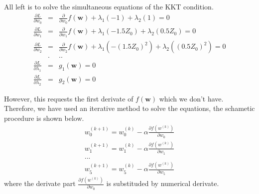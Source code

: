 All left is to solve the simultaneous equations of the KKT condition.
\begin{eqnarray}
  \frac{\partial L}{\partial w_0}&=&\frac{\partial}{\partial w_0}f(\mathbf{w})+\lambda_1(-1)+\lambda_2(1)=0\\
  \frac{\partial L}{\partial w_1}&=&\frac{\partial}{\partial w_1}f(\mathbf{w})+\lambda_1(-1.5Z_0)+\lambda_2(0.5Z_0)=0\\\nonumber
  \frac{\partial L}{\partial w_2}&=&\frac{\partial}{\partial w_2}f(\mathbf{w})+\lambda_1(-(1.5Z_0)^2)+\lambda_2((0.5Z_0)^2)=0\\\nonumber
  &.&..\\\nonumber
  \frac{\partial L}{\partial \lambda_1}&=&g_1(\mathbf{w})=0\\\nonumber
  \frac{\partial L}{\partial \lambda_2}&=&g_2(\mathbf{w})=0\nonumber
\end{eqnarray}

However, this requests the first derivate of $f(\mathbf{w})$ which we don't have.
Therefore, we have used an iterative method to solve the equations, the schametic procedure is shown below.
\begin{eqnarray}
  w_0^{(k+1)} = w_0^{(k)} - \alpha\frac{\partial f(w^{(k)})}{\partial w_0}\\
  w_1^{(k+1)} = w_1^{(k)} - \alpha\frac{\partial f(w^{(k)})}{\partial w_1}\\\nonumber
  ...\\\nonumber
  w_5^{(k+1)} = w_5^{(k)} - \alpha\frac{\partial f(w^{(k)})}{\partial w_5}\nonumber
\end{eqnarray}
where the derivate part $\frac{\partial f(w^{(k)})}{\partial w_0}$ is substituded by numerical derivate.


